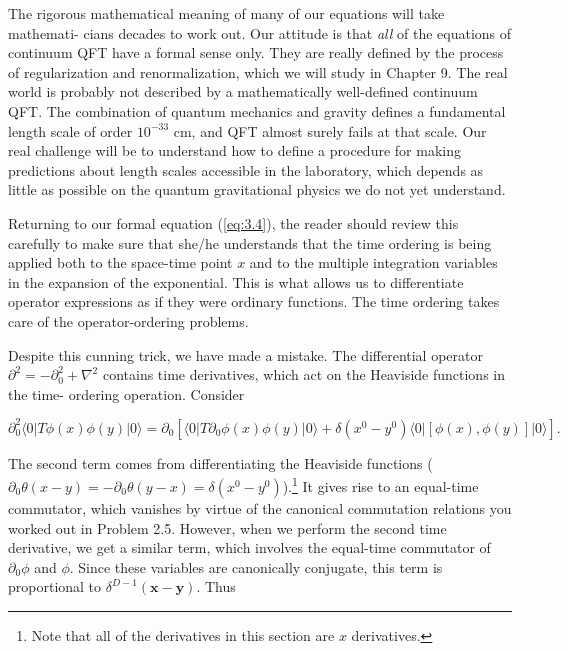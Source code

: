 The rigorous mathematical meaning of many of our equations will take mathemati-
cians decades to work out. Our attitude is that \emph{all} of the equations of continuum
QFT have a formal sense only. They are really defined by the process of regularization
and renormalization, which we will study in Chapter 9. The real world is probably
not described by a mathematically well-defined continuum QFT. The combination of
quantum mechanics and gravity defines a fundamental length scale of order $10^{-33}$ cm,
and QFT almost surely fails at that scale. Our real challenge will be to understand
how to define a procedure for making predictions about length scales accessible in the
laboratory, which depends as little as possible on the quantum gravitational physics we
do not yet understand.

Returning to our formal equation (\ref{eq:3.4}), the reader should review this carefully to
make sure that she/he understands that the time ordering is being applied both to
the space-time point $x$ and to the multiple integration variables in the expansion
of the exponential. This is what allows us to differentiate operator expressions as if
they were ordinary functions. The time ordering takes care of the operator-ordering
problems.

Despite this cunning trick, we have made a mistake. The differential operator $\partial^2=
-\partial_0^2+\nabla^2$ contains time derivatives, which act on the Heaviside functions in the time-
ordering operation. Consider

\begin{equation}
\partial_0^2\langle0|T\phi(x)\phi(y)|0\rangle
=\partial_0\left[\langle0|T\partial_0\phi(x)\phi(y)|0\rangle
+\delta(x^0-y^0)\langle0|[\phi(x),\phi(y)]|0\rangle\right].
\label{eq:3.6}
\end{equation}

The second term comes from differentiating the Heaviside functions ($\partial_0\theta(x-y)=
-\partial_0\theta(y-x)=\delta(x^0-y^0)$).\footnote[2]{Note that all of the derivatives in this section are $x$ derivatives.} It gives rise to an equal-time commutator, which vanishes
by virtue of the canonical commutation relations you worked out in Problem 2.5.
However, when we perform the second time derivative, we get a similar term, which
involves the equal-time commutator of $\partial_0\phi$ and $\phi$. Since these variables are canonically
conjugate, this term is proportional to $\delta^{D-1}(\mathbf x-\mathbf y)$. Thus

